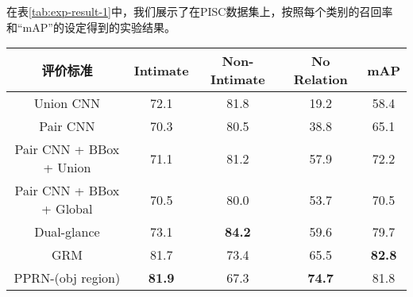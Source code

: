 在表\ref{tab:exp-result-1}中，我们展示了在PISC数据集上，按照每个类别的召回率和``mAP''的设定得到的实验结果。
\begin{table*}[htpb]
  \centering
  \caption{在PISC-coarse上的实验结果，单位为百分比(\%)}
  \label{tab:exp-result-1}
  \begin{tabular}{c|c|c|c|c}
    \toprule
    评价标准 & Intimate & Non-Intimate & No Relation & mAP  \\
    \midrule
    Union CNN \cite{lu2016visual} & 72.1 & 81.8 & 19.2 & 58.4   \\
    \midrule
    Pair CNN \cite{li2017dual-glance}  & 70.3 & 80.5 & 38.8 & 65.1   \\
    \midrule
    Pair CNN + BBox + Union \cite{li2017dual-glance}  & 71.1 & 81.2 & 57.9 & 72.2   \\
    \midrule
    Pair CNN + BBox + Global \cite{li2017dual-glance}  & 70.5 & 80.0 & 53.7 & 70.5  \\
    \midrule
    Dual-glance \cite{li2017dual-glance} & 73.1 & \textbf{84.2} & 59.6 & 79.7  \\
    \midrule
    GRM \cite{wang2018deep} & 81.7 & 73.4 & 65.5 & \textbf{82.8}   \\
    \midrule
    PPRN-(obj region) & \textbf{81.9} & 67.3 & \textbf{74.7} & 81.8  \\
    \midrule
  \end{tabular}
\end{table*}

